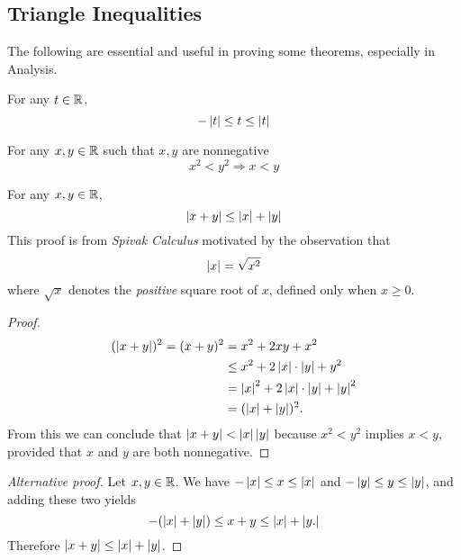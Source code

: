 \subsection{Triangle Inequalities}
The following are essential and useful in proving some theorems, especially in
Analysis.
\begin{prop}
   For any $t \in \mathbb{R}$, 
   \begin{equation*}
     -\left\lvert t\right\rvert \leq t \leq \left\lvert t\right\rvert
   \end{equation*}
\end{prop}
\begin{prop}
  For any $x,y \in \mathbb{R}$ such that $x,y$ are nonnegative
   \begin{equation*}
     x^2 < y^2 \Rightarrow x < y
   \end{equation*}
\end{prop}
\begin{thm}
  For any $x,y \in \mathbb{R}$,
  \begin{equation*}
     \left\lvert x+y\right\rvert \leq \left\lvert x\right\rvert+\left\lvert y\right\rvert
  \end{equation*}
     This proof is from \emph{Spivak Calculus} motivated by the observation that
      \begin{equation*}
       \left\lvert x\right\rvert = \sqrt{x^2}
     \end{equation*}
     where $\sqrt{x}$ denotes the \emph{positive} square root of $x$, defined
     only when $x \geq 0$.
     \begin{proof}
        \begin{align*}
          (\left\lvert x+y\right\rvert)^2=(x+y)^2 &= x^2+2xy+x^2 \\
          &\leq x^2+2\left\lvert x\right\rvert\cdot \left\lvert y\right\rvert+y^2\\
          &= \left\lvert x\right\rvert^2+2\left\lvert x\right\rvert\cdot\left\lvert y\right\rvert+\left\lvert y\right\rvert^2\\
          &= (\left\lvert x\right\rvert+\left\lvert y\right\rvert)^2.
        \end{align*}
        From this we can conclude that $\left\lvert x+y\right\rvert < \left\lvert x\right\rvert \left\lvert y\right\rvert$ because $x^2 <
        y^2$ implies $x < y$, provided that $x$ and $y$ are both nonnegative.
     \end{proof}
     \begin{proof}[Alternative proof]
        Let $x,y \in \mathbb{R}$. We have $-\left\lvert x\right\rvert \leq x \leq \left\lvert x\right\rvert$ and $-\left\lvert y\right\rvert
        \leq y \leq \left\lvert y\right\rvert$, and adding these two yields
        \begin{equation*}
          -(\left\lvert x\right\rvert+\left\lvert y\right\rvert) \leq x+y \leq \left\lvert x\right\rvert+\left\lvert y.\right\rvert
        \end{equation*}
        Therefore  $\left\lvert x+y\right\rvert \leq \left\lvert x\right\rvert+\left\lvert y\right\rvert$.
     \end{proof}
\end{thm}
